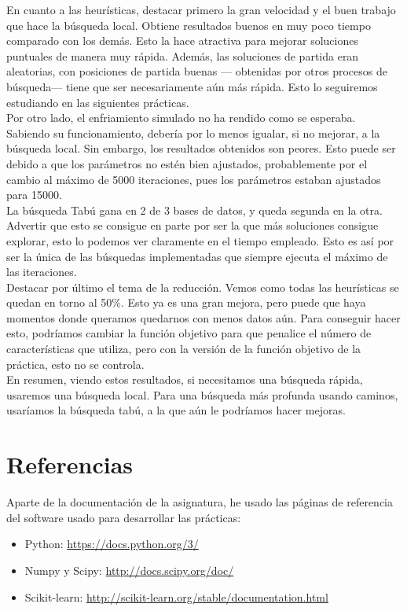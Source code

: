 En cuanto a las heurísticas, destacar primero la gran velocidad y el buen trabajo que hace la búsqueda local. Obtiene resultados buenos en muy poco tiempo comparado con los demás. Esto la hace atractiva para mejorar soluciones puntuales de manera muy rápida. Además, las soluciones de partida eran aleatorias, con posiciones de partida buenas --- obtenidas por otros procesos de búsqueda--- tiene que ser necesariamente aún más rápida. Esto lo seguiremos estudiando en las siguientes prácticas.\\

Por otro lado, el enfriamiento simulado no ha rendido como se esperaba. Sabiendo su funcionamiento, debería por lo menos igualar, si no mejorar, a la búsqueda local. Sin embargo, los resultados obtenidos son peores. Esto puede ser debido a que los parámetros no estén bien ajustados, probablemente por el cambio al máximo de 5000 iteraciones, pues los parámetros estaban ajustados para 15000.\\

La búsqueda Tabú gana en 2 de 3 bases de datos, y queda segunda en la otra. Advertir que esto se consigue en parte por ser la que más soluciones consigue explorar, esto lo podemos ver claramente en el tiempo empleado. Esto es así por ser la única de las búsquedas implementadas que siempre ejecuta el máximo de las iteraciones.\\

Destacar por último el tema de la reducción. Vemos como todas las heurísticas se quedan en torno al 50$\%$. Esto ya es una gran mejora, pero puede que haya momentos donde queramos quedarnos con menos datos aún. Para conseguir hacer esto, podríamos cambiar la función objetivo para que penalice el número de características que utiliza, pero con la versión de la función objetivo de la práctica, esto no se controla. \\

En resumen, viendo estos resultados, si necesitamos una búsqueda rápida, usaremos una búsqueda local. Para una búsqueda más profunda usando caminos, usaríamos la búsqueda tabú, a la que aún le podríamos hacer mejoras.\\
\newpage
\section{Referencias}
Aparte de la documentación de la asignatura, he usado las páginas de referencia del software usado para desarrollar las prácticas:
\begin{itemize}
\item Python:  \url{https://docs.python.org/3/}
\item Numpy y Scipy: \url{http://docs.scipy.org/doc/}
\item Scikit-learn: \url{http://scikit-learn.org/stable/documentation.html}
\end{itemize}

